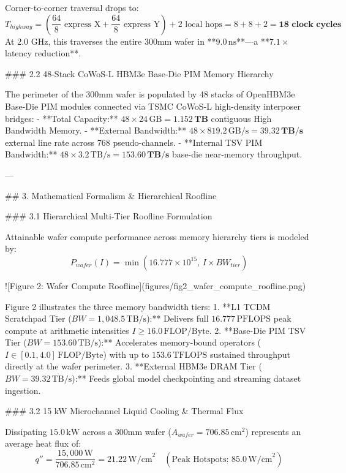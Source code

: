 \documentclass[journal,10pt,twocolumn]{IEEEtran}
\begin{document}
Corner-to-corner traversal drops to:
$$T_{highway} = \left(\frac{64}{8} \text{ express X} + \frac{64}{8} \text{ express Y}\right) + 2 \text{ local hops} = 8 + 8 + 2 = \mathbf{18\text{ clock cycles}}$$
At 2.0 GHz, this traverses the entire 300mm wafer in **$9.0\,\text{ns}$**—a **$7.1\times$ latency reduction**.

### 2.2 48-Stack CoWoS-L HBM3e Base-Die PIM Memory Hierarchy

The perimeter of the 300mm wafer is populated by 48 stacks of OpenHBM3e Base-Die PIM modules connected via TSMC CoWoS-L high-density interposer bridges:
- **Total Capacity:** $48 \times 24\,\text{GB} = \mathbf{1.152\,\text{TB}}$ contiguous High Bandwidth Memory.
- **External Bandwidth:** $48 \times 819.2\,\text{GB/s} = \mathbf{39.32\,\text{TB/s}}$ external line rate across 768 pseudo-channels.
- **Internal TSV PIM Bandwidth:** $48 \times 3.2\,\text{TB/s} = \mathbf{153.60\,\text{TB/s}}$ base-die near-memory throughput.

---

## 3. Mathematical Formalism & Hierarchical Roofline

### 3.1 Hierarchical Multi-Tier Roofline Formulation

Attainable wafer compute performance across memory hierarchy tiers is modeled by:
$$P_{wafer}(I) = \min\left(16.777 \times 10^{15}, \, I \times BW_{tier}\right)$$

![Figure 2: Wafer Compute Roofline](figures/fig2_wafer_compute_roofline.png)

Figure 2 illustrates the three memory bandwidth tiers:
1. **L1 TCDM Scratchpad Tier ($BW = 1,048.5\,\text{TB/s}$):** Delivers full $16.777\,\text{PFLOPS}$ peak compute at arithmetic intensities $I \ge 16.0\,\text{FLOP/Byte}$.
2. **Base-Die PIM TSV Tier ($BW = 153.60\,\text{TB/s}$):** Accelerates memory-bound operators ($I \in [0.1, 4.0]\,\text{FLOP/Byte}$) with up to $153.6\,\text{TFLOPS}$ sustained throughput directly at the wafer perimeter.
3. **External HBM3e DRAM Tier ($BW = 39.32\,\text{TB/s}$):** Feeds global model checkpointing and streaming dataset ingestion.

### 3.2 15 kW Microchannel Liquid Cooling & Thermal Flux

Dissipating $15.0\,\text{kW}$ across a 300mm wafer ($A_{wafer} = 706.85\,\text{cm}^2$) represents an average heat flux of:
$$q'' = \frac{15,000\,\text{W}}{706.85\,\text{cm}^2} = 21.22\,\text{W/cm}^2 \quad (\text{Peak Hotspots: } 85.0\,\text{W/cm}^2)$$
\end{document}
